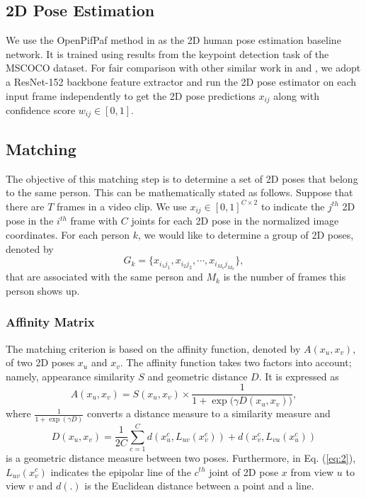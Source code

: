 \documentclass{article}
\begin{document}
\subsection{2D Pose Estimation}\label{subsec:2dpose}

We use the OpenPifPaf method in \cite{kreiss2019pifpaf} as the 2D human
pose estimation baseline network. It is trained using results from the
keypoint detection task of the MSCOCO dataset. For fair comparison with
other similar work in \cite{kolotouros2019learning} and
\cite{kocabas2019vibe}, we adopt a ResNet-152 \cite{he2016identity}
backbone feature extractor and run the 2D pose estimator on each input
frame independently to get the 2D pose predictions $x_{ij}$ along with
confidence score $w_{ij} \in [0,1]$. 

\subsection{Matching}

The objective of this matching step is to determine a set of 2D poses
that belong to the same person. This can be mathematically stated as
follows. Suppose that there are $T$ frames in a video clip. We use
$x_{ij} \in [0,1]^{C\times2}$ to indicate the $j^{th}$ 2D pose in the
$i^{th}$ frame with $C$ joints for each 2D pose in the normalized image
coordinates.  For each person $k$, we would like to determine a group of
2D poses, denoted by
$$
G_k = \{ x_{i_1j_1}, x_{i_2j_2}, \cdots, x_{i_{M_k}j_{M_k}} \},
$$ 
that are associated with the same person and $M_k$ is the number of
frames this person shows up. 

\subsubsection{Affinity Matrix}

The matching criterion is based on the affinity function, denoted by
$A(x_u, x_v)$, of two 2D poses $x_u$ and $x_v$. The affinity
function takes two factors into account; namely, appearance 
similarity $S$ and geometric distance $D$. It is expressed as
\begin{equation} \label{eq:1}
A(x_u, x_v) = S(x_u, x_v) \times \frac{1}{1 + \exp{\big( \gamma D(x_u,
x_v) \big)}},
\end{equation}
where $\frac{1}{1+\exp{(\gamma D)}}$ converts a distance measure to 
a similarity measure and
\begin{equation} \label{eq:2}
D(x_u, x_v) = \frac{1}{2C} \sum_{c=1}^C  d(x_u^c, L_{uv}(x_v^c)) + 
d(x_v^c, L_{vu}(x_u^c))
\end{equation}
is a geometric distance measure between two poses. Furthermore, in Eq.
(\ref{eq:2}), $L_{uv}(x_v^c)$ indicates the epipolar line of the
$c^{th}$ joint of 2D pose $x$ from view $u$ to view $v$ and $d(.)$ is
the Euclidean distance between a point and a line. 
\end{document}
